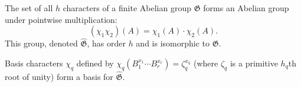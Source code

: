 The set of all $h$ characters of a finite Abelian group $\mathfrak{G}$ forms an Abelian group under pointwise multiplication:
$$(\chi_1 \chi_2)(A) = \chi_1(A) \cdot \chi_2(A).$$
This group, denoted $\widehat{\mathfrak{G}}$, has order $h$ and is isomorphic to $\mathfrak{G}$.

Basis characters $\chi_q$ defined by $\chi_q(B_1^{x_1} \cdots B_r^{x_r}) = \zeta_q^{x_q}$ (where $\zeta_q$ is a primitive $h_q$th root of unity) form a basis for $\widehat{\mathfrak{G}}$.
